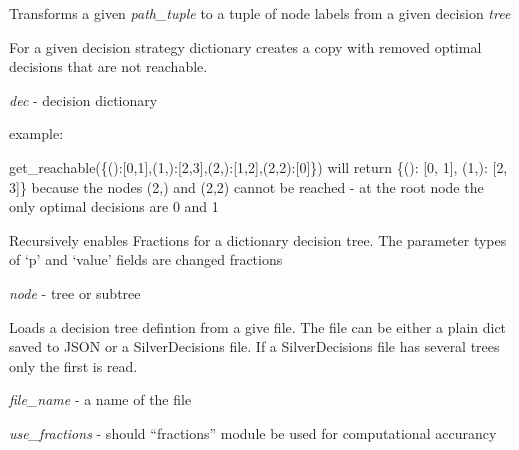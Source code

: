 \documentclass[a4paper,10pt,english]{sphinxmanual}
\begin{document}

\begin{fulllineitems}
	\label{index:chondro.get_decision_name}
	Transforms a given \emph{path\_tuple} to a tuple of node labels from 
	a given decision \emph{tree}
	
\end{fulllineitems}


\begin{fulllineitems}
	\label{index:chondro.get_reachable}
	For a given decision strategy dictionary creates a copy 
	with removed optimal decisions that are not reachable.
	
	\emph{dec} - decision dictionary
	
	example:
	
	get\_reachable(\{():{[}0,1{]},(1,):{[}2,3{]},(2,):{[}1,2{]},(2,2):{[}0{]}\})      will return  \{(): {[}0, 1{]}, (1,): {[}2, 3{]}\} because the nodes (2,) and (2,2)     cannot be reached - at the root node the only optimal decisions are 0 and 1
	
\end{fulllineitems}


\begin{fulllineitems}
	\label{index:chondro.go_fractions}
	Recursively enables Fractions for a dictionary decision tree.
	The parameter types of `p' and `value' fields are changed fractions
	
	\emph{node} - tree or subtree
	
\end{fulllineitems}


\begin{fulllineitems}
	\label{index:chondro.load_tree}
	Loads a decision tree defintion from a give file.
	The file can be either a plain dict saved to JSON or a SilverDecisions 
	file. If a SilverDecisions file has several trees only the first is read.
	
	\emph{file\_name} - a name of the file
	
	\emph{use\_fractions} - should ``fractions'' module be used for computational     accurancy
	
\end{fulllineitems}
\end{document}
